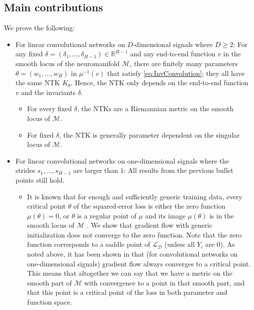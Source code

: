 \documentclass[twoside]{article}
\theoremstyle{definition}
\theoremstyle{remark}
\begin{document}
\subsection{Main contributions} \label{sec:mainContr}
We prove the following:
\begin{itemize}
    \item For linear convolutional networks on $D$-dimensional signals where $D \geq 2$: For any fixed   $\delta = (\delta_1, \ldots, \delta_{H-1}) \in \mathbb{R}^{H-1}$ and any end-to-end function $v$ in the smooth locus of the neuromanifold $\mathcal{M}$, there are finitely many parameters $\theta = (w_1, \ldots, w_H)$ in $\mu^{-1}(v)$ that satisfy \eqref{eq:InvConvolution}; they all have the same NTK $K_\theta$.  
    Hence, the NTK only depends on the end-to-end function $v$ and the invariants $\delta$.
    \begin{itemize}
        \item For every fixed $\delta$, the NTKs are a Riemannian metric on the smooth locus of $\mathcal{M}$.
        \item For fixed $\delta$, the NTK is generally parameter dependent on the singular locus of $\mathcal{M}$.
    \end{itemize}
    \item For linear convolutional networks on one-dimensional signals where the strides $s_1, \ldots, s_{H-1} $ are larger than $1$:
    All results from the previous bullet points still hold.
    \begin{itemize}
        \item It is known that for enough and sufficiently generic training data, every critical point $\theta$ of the squared-error loss is either the zero function $\mu(\theta)=0$, or $\theta$ is a regular point of $\mu$ and its image $\mu(\theta)$ is in the smooth locus of $\mathcal{M}$ \cite[Theorem~2.12]{kohn2024function}.
        We show that gradient flow with generic initialization does not converge to the zero function. Note that the zero function corresponds to a saddle point of $\mathcal{L}_{\mathcal{D}}$ (unless all $Y_i$ are $0$). As noted above, it has been shown in \cite{dirati25} that (for convolutional networks on one-dimensional signals)  gradient flow always converges to a critical point. This means that altogether
        we can say that we have a metric on the smooth part of $\mathcal{M}$ with convergence to a point in that smooth part, and that this point is a critical point of the loss in both parameter and function space.
    \end{itemize}

\end{itemize}
\end{document}
